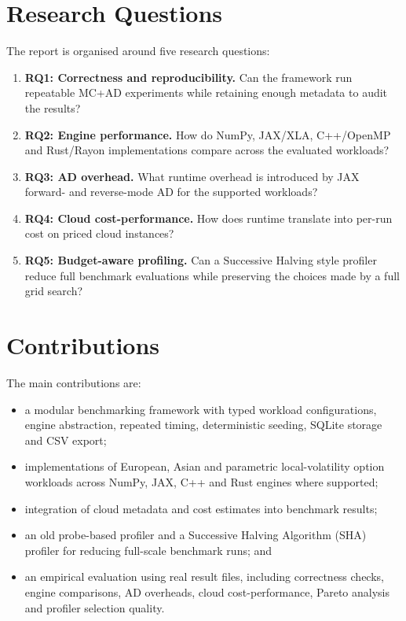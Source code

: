 \section{Research Questions}

The report is organised around five research questions:
\begin{enumerate}
    \item \textbf{RQ1: Correctness and reproducibility.} Can the framework run repeatable MC+AD experiments while retaining enough metadata to audit the results?
    \item \textbf{RQ2: Engine performance.} How do NumPy, JAX/XLA, C++/OpenMP and Rust/Rayon implementations compare across the evaluated workloads?
    \item \textbf{RQ3: AD overhead.} What runtime overhead is introduced by JAX forward- and reverse-mode AD for the supported workloads?
    \item \textbf{RQ4: Cloud cost-performance.} How does runtime translate into per-run cost on priced cloud instances?
    \item \textbf{RQ5: Budget-aware profiling.} Can a Successive Halving style profiler reduce full benchmark evaluations while preserving the choices made by a full grid search?
\end{enumerate}

\section{Contributions}

The main contributions are:
\begin{itemize}
    \item a modular benchmarking framework with typed workload configurations, engine abstraction, repeated timing, deterministic seeding, SQLite storage and CSV export;
    \item implementations of European, Asian and parametric local-volatility option workloads across NumPy, JAX, C++ and Rust engines where supported;
    \item integration of cloud metadata and cost estimates into benchmark results;
    \item an old probe-based profiler and a Successive Halving Algorithm (SHA) profiler for reducing full-scale benchmark runs; and
    \item an empirical evaluation using real result files, including correctness checks, engine comparisons, AD overheads, cloud cost-performance, Pareto analysis and profiler selection quality.
\end{itemize}

